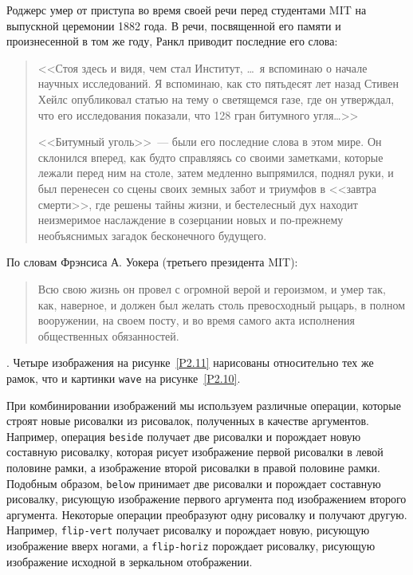{  Роджерс умер от приступа во время своей речи перед
  студентами MIT на выпускной церемонии 1882 года. В речи, посвященной
  его памяти и произнесенной в том же году, Ранкл приводит последние его слова:

  \begin{quote}
    <<Стоя здесь и видя, чем стал Институт, \ldots\ я
    вспоминаю о начале научных исследований.  Я вспоминаю, как сто
    пятьдесят лет назад Стивен Хейлс опубликовал статью на тему о светящемся 
    газе, где он утверждал, что его исследования показали, что 128 гран
    битумного угля\ldots>>

    <<Битумный уголь>>~--- были его последние слова 
    в этом мире.  Он склонился вперед, как будто справляясь со своими
    заметками, которые лежали перед ним на столе, затем медленно
    выпрямился, поднял руки, и был перенесен со сцены своих земных забот и 
    триумфов в <<завтра смерти>>, где решены тайны жизни, и бестелесный
    дух находит неизмеримое наслаждение в созерцании новых и по-прежнему
    необъяснимых загадок бесконечного будущего.
  \end{quote}

  По словам  Фрэнсиса А. Уокера (третьего президента
  MIT):

  \begin{quote}
    Всю свою жизнь он провел с огромной верой и
    героизмом, и умер так, как, наверное, и должен был желать столь
    превосходный рыцарь, в полном вооружении, на своем посту, и во время
    самого акта исполнения общественных обязанностей.
  \end{quote}}.
Четыре изображения на рисунке~\ref{P2.11} нарисованы относительно тех же
рамок, что и картинки {\tt wave} на рисунке~\ref{P2.10}.

При комбинировании изображений мы используем различные
операции, которые строят новые рисовалки из рисовалок, полученных в
качестве аргументов.  Например, операция {\tt beside}
получает
две рисовалки и порождает новую составную рисовалку, которая рисует
изображение первой рисовалки в левой половине рамки, а изображение
второй рисовалки в правой половине рамки.  Подобным образом,
{\tt below} 
принимает две рисовалки и порождает составную
рисовалку, рисующую изображение первого аргумента под изображением
второго аргумента.  Некоторые операции преобразуют одну рисовалку и
получают другую.  Например, {\tt flip-vert}
получает рисовалку и 
порождает новую, рисующую изображение вверх ногами, а
{\tt flip-horiz}
порождает рисовалку, рисующую изображение
исходной в зеркальном отображении.


